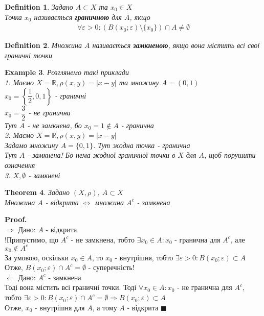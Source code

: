 \documentclass[a4paper, 14pt]{extarticle}
\def\rightproof{$\boxed{\Rightarrow}$ }
\def\leftproof{$\boxed{\Leftarrow}$ }
\theoremstyle{theoremdd}
\newtheorem{theorem}{Theorem}[subsection]
\theoremstyle{theoremdd}
\newtheorem{definition}[theorem]{Definition}
\theoremstyle{theoremdd}
\theoremstyle{theoremdd}
\newtheorem{example}[theorem]{Example}
\theoremstyle{theoremdd}
\theoremstyle{theoremdd}
\theoremstyle{theoremdd}
\theoremstyle{theoremdd}
\newenvironment{pf}{\vspace*{-3mm} \textbf{Proof. \\}}{$\blacksquare$}
\begin{document}
\begin{definition}
Задано $A \subset X$ та $x_0 \in X$\\
Точка $x_0$ називається \textbf{граничною} для $A$, якщо
\begin{align*}
\forall \varepsilon > 0: (B(x_0;\varepsilon) \setminus \{x_0\}) \cap A \neq \emptyset
\end{align*}
\end{definition}

\begin{definition}
Множина $A$ називається \textbf{замкненою}, якщо вона містить всі свої граничні точки
\end{definition}

\begin{example}
Розглянемо такі приклади \\
1. Маємо $X = \mathbb{R}, \rho(x,y) = |x-y|$ та множину $A = (0,1)$\\
$x_0 = \left\{\dfrac{1}{2}, 0, 1\right\}$ - граничні\\
$x_0 = \dfrac{3}{2}$ - не гранична\\
Тут $A$ - не замкнена, бо $x_0 = 1 \not \in A$ - гранична
\bigskip \\
2. Маємо $X = \mathbb{R}, \rho(x,y) = |x-y|$\\
Задамо множину $A = \{0,1 \}$. Тут жодна точка - гранична\\
Тут $A$ - замкнена! Бо нема жодної граничної точки в $X$ для $A$, щоб порушити означення
\bigskip \\
3. $X, \emptyset$ - замкнені
\end{example}

\begin{theorem}
Задано $(X,\rho)$, $A \subset X$\\
Множина $A$ - відкрита $\iff$ множина $A^c$ - замкнена
\end{theorem}

\begin{pf}
\rightproof Дано: $A$ - відкрита\\
!Припустимо, що $A^c$ - не замкнена, тобто $\exists x_0 \in A: x_0$ - гранична для $A^c$, але $x_0 \not\in A^c$\\
За умовою, оскільки $x_0 \in A$, то $x_0$ - внутрішня, тобто $\exists \varepsilon > 0: B(x_0;\varepsilon) \subset A$\\
Отже, $B(x_0;\varepsilon) \cap A^c = \emptyset$ - суперечність!
\bigskip \\

\leftproof Дано: $A^c$ - замкнена\\
Тоді вона містить всі граничні точки. Тоді $\forall x_0 \in A: x_0$ - не гранична для $A^c$, тобто $\exists \varepsilon > 0: B(x_0;\varepsilon) \cap A^c = \emptyset \Rightarrow B(x_0;\varepsilon) \subset A$\\
Отже, $x_0$ - внутрішня для $A$, а тому $A$ - відкрита
\end{pf}
\end{document}
